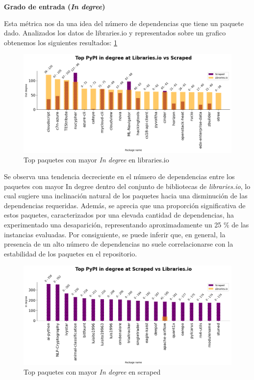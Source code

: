 \textbf{Grado de entrada (\textit{In degree})}

Esta métrica nos da una idea del número de dependencias que tiene un paquete dado.
Analizados los datos de libraries.io y representados sobre un grafico obtenemos los siguientes resultados: \ref{fig:pypi_libio_ind_comparison}

\begin{figure}[h!]
    \begin{center}
        \includegraphics[width=1\textwidth]{img/pypi/libio_t20_ind_comparison.png}
        \caption{Top paquetes con mayor \textit{In degree} en libraries.io}
        \label{fig:pypi_libio_ind_comparison}
    \end{center}
\end{figure}

Se observa una tendencia decreciente en el número de dependencias entre los paquetes con mayor In degree
dentro del conjunto de bibliotecas de \textit{libraries.io}, lo cual sugiere una inclinación natural de los
paquetes hacia una disminución de las dependencias requeridas. Además, se aprecia que una proporción significativa
de estos paquetes, caracterizados por una elevada cantidad de dependencias, ha experimentado una desaparición,
representando aproximadamente un 25 \% de las instancias evaluadas. Por consiguiente, se puede inferir que,
en general, la presencia de un alto número de dependencias no suele correlacionarse con la estabilidad de
los paquetes en el repositorio.

\begin{figure}[h!]
    \begin{center}
        \includegraphics[width=1\textwidth]{img/pypi/scraped_t20_ind_comparison.png}
        \caption{Top paquetes con mayor \textit{In degree} en scraped}
        \label{fig:pypi_scraped_ind_comparison}
    \end{center}
\end{figure}

